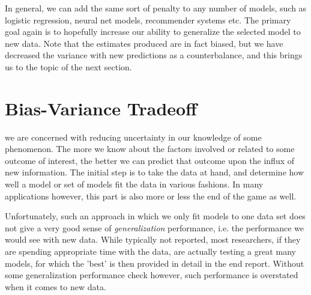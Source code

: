 \documentclass[english,nohyper,titlepage]{tufte-handout}\usepackage{knitr}
\begin{document}
In general, we can add the same sort of penalty to any number of models, such as logistic regression, neural net models, recommender systems etc.  The primary goal again is to hopefully increase our ability to generalize the selected model to new data.  Note that the estimates produced are in fact biased, but we have decreased the variance with new predictions as a counterbalance, and this brings us to the topic of the next section.







\part{Bias-Variance Tradeoff}
 we are concerned with reducing uncertainty in our knowledge of some phenomenon.  The more we know about the factors involved or related to some outcome of interest, the better we can predict that outcome upon the influx of new information.  The initial step is to take the data at hand, and determine how well a model or set of models fit the data in various fashions.  In many applications however, this part is also more or less the end of the game as well.

Unfortunately, such an approach in which we only fit models to one data set does not give a very good sense of \emph{generalization} performance, i.e. the performance we would see with new data.  While typically not reported, most researchers, if they are spending appropriate time with the data, are actually testing a great many models, for which the 'best' is then provided in detail in the end report.  Without some generalization performance check however, such performance is overstated when it comes to new data.
\end{document}
